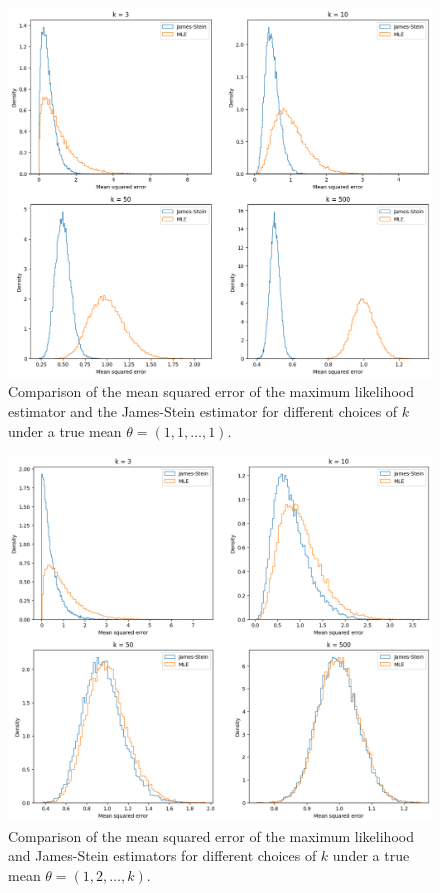 \begin{ex}
  \inputminted{python}{../code/12-06.py}

  \begin{figure}[H]
    \centering
    \includegraphics[scale=0.545]{../images/12-06a}
    \caption{Comparison of the mean squared error of the maximum likelihood
      estimator and the James-Stein estimator for different choices of $k$ under
      a true mean $\theta=(1,1,\ldots,1)$.}
  \end{figure}

  \begin{figure}[H]
    \centering
    \includegraphics[scale=0.54]{../images/12-06b}
    \caption{Comparison of the mean squared error of the maximum likelihood
      and James-Stein estimators for different choices of $k$ under
      a true mean $\theta=(1,2,\ldots,k)$.}
  \end{figure}
\end{ex}